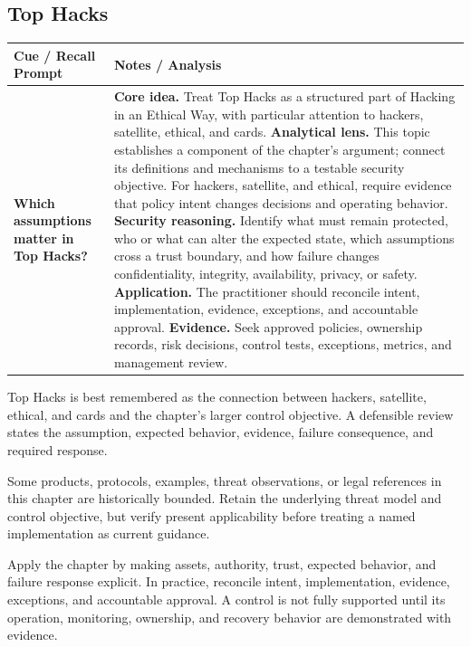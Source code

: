 \documentclass[11pt]{article}
\newcommand{\CornellHeader}{%
\rowcolor{Navy}\color{white}\bfseries Cue / Recall Prompt & \color{white}\bfseries Notes / Analysis\\\hline}
\newcommand{\CornellRow}[2]{%
\cellcolor{CueGray}\RaggedRight\textbf{#1} & \RaggedRight #2\\\hline}
\begin{document}
\subsection*{Top Hacks}
\begin{longtable}{>{\RaggedRight\arraybackslash}p{}|>{\RaggedRight\arraybackslash}p{}}
\CornellHeader
\CornellRow{Which assumptions matter in Top Hacks?}{\textbf{Core idea.} Treat Top Hacks as a structured part of Hacking in an Ethical Way, with particular attention to hackers, satellite, ethical, and cards. \textbf{Analytical lens.} This topic establishes a component of the chapter's argument; connect its definitions and mechanisms to a testable security objective. For hackers, satellite, and ethical, require evidence that policy intent changes decisions and operating behavior. \textbf{Security reasoning.} Identify what must remain protected, who or what can alter the expected state, which assumptions cross a trust boundary, and how failure changes confidentiality, integrity, availability, privacy, or safety. \textbf{Application.} The practitioner should reconcile intent, implementation, evidence, exceptions, and accountable approval. \textbf{Evidence.} Seek approved policies, ownership records, risk decisions, control tests, exceptions, metrics, and management review.}
\end{longtable}
\begin{topicsummary}
Top Hacks is best remembered as the connection between hackers, satellite, ethical, and cards and the chapter's larger control objective. A defensible review states the assumption, expected behavior, evidence, failure consequence, and required response.
\end{topicsummary}
\begin{historybox}
Some products, protocols, examples, threat observations, or legal references in this chapter are historically bounded. Retain the underlying threat model and control objective, but verify present applicability before treating a named implementation as current guidance.
\end{historybox}
\begin{defensebox}
Apply the chapter by making assets, authority, trust, expected behavior, and failure response explicit. In practice, reconcile intent, implementation, evidence, exceptions, and accountable approval. A control is not fully supported until its operation, monitoring, ownership, and recovery behavior are demonstrated with evidence.
\end{defensebox}
\end{document}
